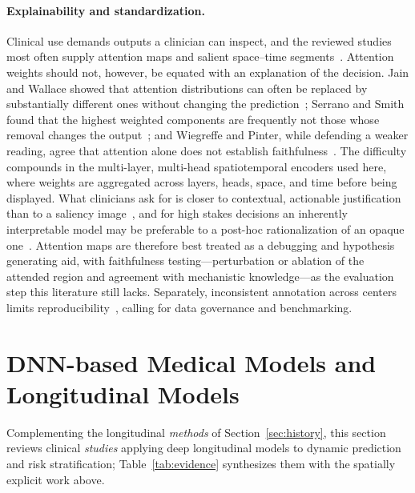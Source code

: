 \documentclass[journal]{IEEEtran}
\newif\ifsubmission
\begin{document}
\paragraph{Explainability and standardization.} Clinical use demands outputs a clinician can inspect, and the reviewed studies most often supply attention maps and salient space--time segments~\cite{2,4}. Attention weights should not, however, be equated with an explanation of the decision. Jain and Wallace showed that attention distributions can often be replaced by substantially different ones without changing the prediction~\cite{jain2019attention}; Serrano and Smith found that the highest weighted components are frequently not those whose removal changes the output~\cite{serrano2019attention}; and Wiegreffe and Pinter, while defending a weaker reading, agree that attention alone does not establish faithfulness~\cite{wiegreffe2019attention}. The difficulty compounds in the multi-layer, multi-head spatiotemporal encoders used here, where weights are aggregated across layers, heads, space, and time before being displayed. What clinicians ask for is closer to contextual, actionable justification than to a saliency image~\cite{tonekaboni2019clinicians}, and for high stakes decisions an inherently interpretable model may be preferable to a post-hoc rationalization of an opaque one~\cite{rudin2019stopexplaining}. Attention maps are therefore best treated as a debugging and hypothesis generating aid, with faithfulness testing---perturbation or ablation of the attended region and agreement with mechanistic knowledge---as the evaluation step this literature still lacks. Separately, inconsistent annotation across centers limits reproducibility~\cite{6}, calling for data governance and benchmarking.

\fi

\section{DNN-based Medical Models and Longitudinal Models}
\label{sec:categorization}
\ifsubmission
Complementing the longitudinal \emph{methods} of Section~\ref{sec:history}, this section reviews clinical \emph{studies} applying deep longitudinal models to dynamic prediction and risk stratification; Table~\ref{tab:evidence} synthesizes them with the spatially explicit work above.
\end{document}
